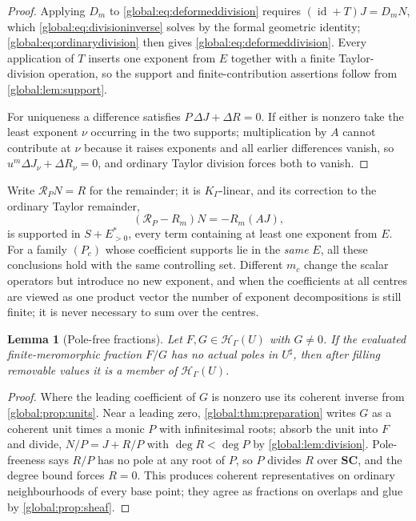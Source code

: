 \documentclass[11pt,letterpaper]{article}
\newtheorem{lemma}[lemma]{Lemma}
\theoremstyle{definition}
\theoremstyle{remark}
\newcommand{\SC}{\mathbf{SC}}
\newcommand{\HH}{\mathscr H_\Gamma}
\newcommand{\KK}{K_\Gamma}
\newcommand{\sh}{^{\sharp}}
\newcommand{\id}{\operatorname{id}}
\newcommand{\jet}{\mathcal R}
\numberwithin{equation}{section}
\begin{document}
\begin{proof}
Applying $D_m$ to \eqref{global:eq:deformeddivision} requires $(\id+T)J=D_mN$, which \eqref{global:eq:divisioninverse} solves by the formal geometric identity; \eqref{global:eq:ordinarydivision} then gives \eqref{global:eq:deformeddivision}. Every application of $T$ inserts one exponent from $E$ together with a finite Taylor-division operation, so the support and finite-contribution assertions follow from \cref{global:lem:support}.

For uniqueness a difference satisfies $P\,\Delta J+\Delta R=0$. If either is nonzero take the least exponent $\nu$ occurring in the two supports; multiplication by $A$ cannot contribute at $\nu$ because it raises exponents and all earlier differences vanish, so $u^m\Delta J_\nu+\Delta R_\nu=0$, and ordinary Taylor division forces both to vanish.
\end{proof}

Write $\jet_PN=R$ for the remainder; it is $\KK$-linear, and its correction to the ordinary Taylor remainder,
\begin{equation}\label{global:eq:remaindercorrection}
  (\jet_P-R_m)N=-R_m(AJ),
\end{equation}
is supported in $S+E^*_{>0}$, every term containing at least one exponent from $E$. For a family $(P_c)$ whose coefficient supports lie in the \emph{same} $E$, all these conclusions hold with the same controlling set. Different $m_c$ change the scalar operators but introduce no new exponent, and when the coefficients at all centres are viewed as one product vector the number of exponent decompositions is still finite; it is never necessary to sum over the centres.

\begin{lemma}[Pole-free fractions]\label{global:lem:polefree}
Let $F,G\in\HH(U)$ with $G\ne0$. If the evaluated finite-meromorphic fraction $F/G$ has no actual poles in $U\sh$, then after filling removable values it is a member of $\HH(U)$.
\end{lemma}

\begin{proof}
Where the leading coefficient of $G$ is nonzero use its coherent inverse from \cref{global:prop:units}. Near a leading zero, \cref{global:thm:preparation} writes $G$ as a coherent unit times a monic $P$ with infinitesimal roots; absorb the unit into $F$ and divide, $N/P=J+R/P$ with $\deg R<\deg P$ by \cref{global:lem:division}. Pole-freeness says $R/P$ has no pole at any root of $P$, so $P$ divides $R$ over $\SC$, and the degree bound forces $R=0$. This produces coherent representatives on ordinary neighbourhoods of every base point; they agree as fractions on overlaps and glue by \cref{global:prop:sheaf}.
\end{proof}
\end{document}
